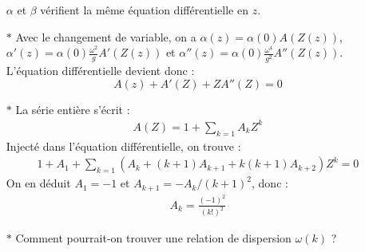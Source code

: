 \documentclass{report}
\begin{document}
\begin{itemize}
		$\alpha$ et $\beta$ vérifient la même équation différentielle en $z$.
		
		\item[$\ast$] Avec le changement de variable, on a $\alpha(z)=\alpha(0)A(Z(z))$, $\alpha'(z)=\alpha(0)\frac{\omega^2}{g}A'(Z(z))$ et $\alpha''(z)=\alpha(0)\frac{\omega^4}{g^2}A''(Z(z))$. L'équation différentielle devient donc :
		\begin{equation}
			A(z)+A'(Z)+ZA''(Z)=0
		\end{equation}
		
		\item[$\ast$] La série entière s'écrit :
		\begin{align*}
			A(Z) = 1+\sum_{k=1} A_kZ^k
		\end{align*}
		Injecté dans l'équation différentielle, on trouve :
	\begin{align*}
		1+A_1+\sum_{k=1}(A_k+(k+1)A_{k+1}+k(k+1)A_{k+2})Z^k=0
	\end{align*}		
	On en déduit $A_1=-1$ et $A_{k+1}=-A_k/(k+1)^2$, donc :
	\begin{align*}
		A_k=\frac{(-1)^2}{(k!)^2}
	\end{align*}		
		
		\item[$\ast$] Comment pourrait-on trouver une relation de dispersion $\omega(k)$ ?
		
\end{itemize}
\end{document}
